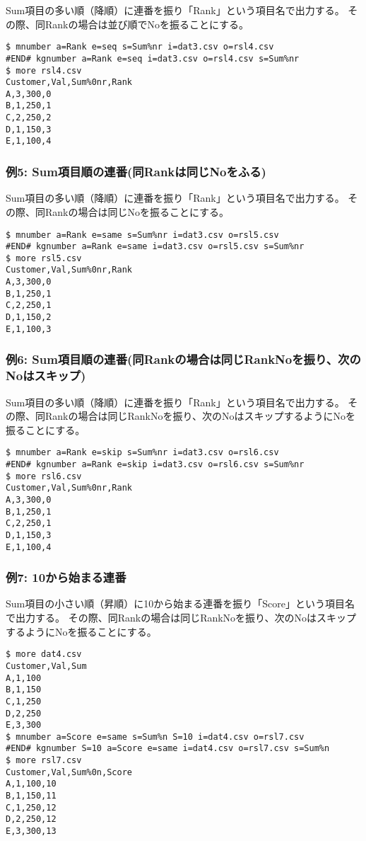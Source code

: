 Sum項目の多い順（降順）に連番を振り「Rank」という項目名で出力する。
その際、同Rankの場合は並び順でNoを振ることにする。


\begin{Verbatim}[baselinestretch=0.7,frame=single]
$ mnumber a=Rank e=seq s=Sum%nr i=dat3.csv o=rsl4.csv
#END# kgnumber a=Rank e=seq i=dat3.csv o=rsl4.csv s=Sum%nr
$ more rsl4.csv
Customer,Val,Sum%0nr,Rank
A,3,300,0
B,1,250,1
C,2,250,2
D,1,150,3
E,1,100,4
\end{Verbatim}
\subsubsection*{例5: Sum項目順の連番(同Rankは同じNoをふる)}

Sum項目の多い順（降順）に連番を振り「Rank」という項目名で出力する。
その際、同Rankの場合は同じNoを振ることにする。


\begin{Verbatim}[baselinestretch=0.7,frame=single]
$ mnumber a=Rank e=same s=Sum%nr i=dat3.csv o=rsl5.csv
#END# kgnumber a=Rank e=same i=dat3.csv o=rsl5.csv s=Sum%nr
$ more rsl5.csv
Customer,Val,Sum%0nr,Rank
A,3,300,0
B,1,250,1
C,2,250,1
D,1,150,2
E,1,100,3
\end{Verbatim}
\subsubsection*{例6: Sum項目順の連番(同Rankの場合は同じRankNoを振り、次のNoはスキップ)}

Sum項目の多い順（降順）に連番を振り「Rank」という項目名で出力する。
その際、同Rankの場合は同じRankNoを振り、次のNoはスキップするようにNoを振ることにする。


\begin{Verbatim}[baselinestretch=0.7,frame=single]
$ mnumber a=Rank e=skip s=Sum%nr i=dat3.csv o=rsl6.csv
#END# kgnumber a=Rank e=skip i=dat3.csv o=rsl6.csv s=Sum%nr
$ more rsl6.csv
Customer,Val,Sum%0nr,Rank
A,3,300,0
B,1,250,1
C,2,250,1
D,1,150,3
E,1,100,4
\end{Verbatim}
\subsubsection*{例7: 10から始まる連番}

Sum項目の小さい順（昇順）に10から始まる連番を振り「Score」という項目名で出力する。
その際、同Rankの場合は同じRankNoを振り、次のNoはスキップするようにNoを振ることにする。


\begin{Verbatim}[baselinestretch=0.7,frame=single]
$ more dat4.csv
Customer,Val,Sum
A,1,100
B,1,150
C,1,250
D,2,250
E,3,300
$ mnumber a=Score e=same s=Sum%n S=10 i=dat4.csv o=rsl7.csv
#END# kgnumber S=10 a=Score e=same i=dat4.csv o=rsl7.csv s=Sum%n
$ more rsl7.csv
Customer,Val,Sum%0n,Score
A,1,100,10
B,1,150,11
C,1,250,12
D,2,250,12
E,3,300,13
\end{Verbatim}
